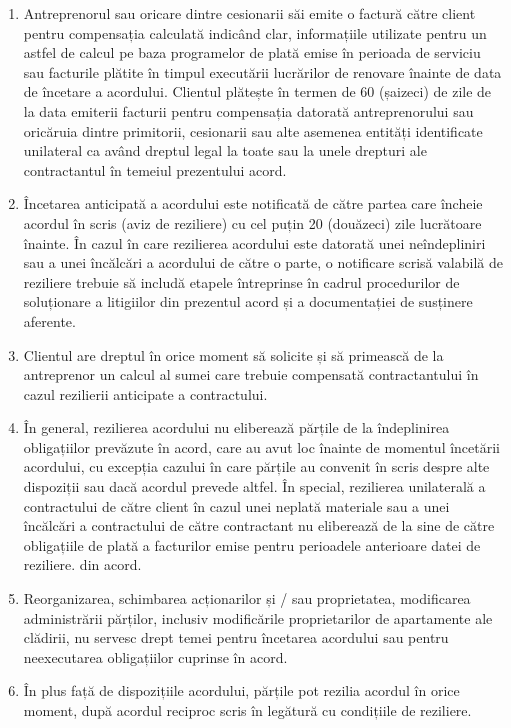 \begin{multicols}{2}
\begin{enumerate}
\begin{enumerate}
\end{enumerate}
\item Antreprenorul sau oricare dintre cesionarii săi emite o factură către client pentru compensația calculată indicând clar, informațiile utilizate pentru un astfel de calcul pe baza programelor de plată emise în perioada de serviciu sau facturile plătite în timpul executării lucrărilor de renovare înainte de data de încetare a acordului. Clientul plătește în termen de 60 (șaizeci) de zile de la data emiterii facturii pentru compensația datorată antreprenorului sau oricăruia dintre primitorii, cesionarii sau alte asemenea entități identificate unilateral ca având dreptul legal la toate sau la unele drepturi ale contractantul în temeiul prezentului acord.
\item Încetarea anticipată a acordului este notificată de către partea care încheie acordul în scris (aviz de reziliere) cu cel puțin 20 (douăzeci) zile lucrătoare înainte. În cazul în care rezilierea acordului este datorată unei neîndepliniri sau a unei încălcări a acordului de către o parte, o notificare scrisă valabilă de reziliere trebuie să includă etapele întreprinse în cadrul procedurilor de soluționare a litigiilor din prezentul acord și a documentației de susținere aferente.
\item Clientul are dreptul în orice moment să solicite și să primească de la antreprenor un calcul al sumei care trebuie compensată contractantului în cazul rezilierii anticipate a contractului.
\item În general, rezilierea acordului nu eliberează părțile de la îndeplinirea obligațiilor prevăzute în acord, care au avut loc înainte de momentul încetării acordului, cu excepția cazului în care părțile au convenit în scris despre alte dispoziții sau dacă acordul prevede altfel. În special, rezilierea unilaterală a contractului de către client în cazul unei neplată materiale sau a unei încălcări a contractului de către contractant nu eliberează de la sine de către obligațiile de plată a facturilor emise pentru perioadele anterioare datei de reziliere. din acord.
\item Reorganizarea, schimbarea acționarilor și / sau proprietatea, modificarea administrării părților, inclusiv modificările proprietarilor de apartamente ale clădirii, nu servesc drept temei pentru încetarea acordului sau pentru neexecutarea obligațiilor cuprinse în acord.
\item În plus față de dispozițiile acordului, părțile pot rezilia acordul în orice moment, după acordul reciproc scris în legătură cu condițiile de reziliere.

\end{enumerate}
\end{multicols}
